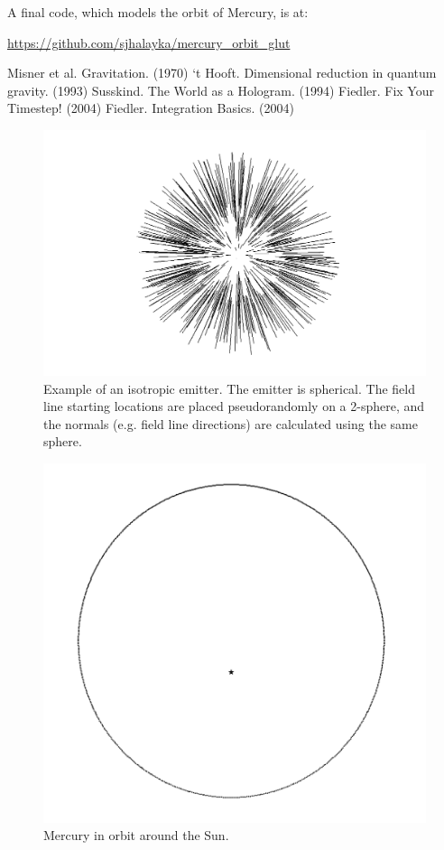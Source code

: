 \documentclass[12pt]{article}
\begin{document}
A final code, which models the orbit of Mercury, is at:

\url{https://github.com/sjhalayka/mercury_orbit_glut}





\begin{thebibliography}{9}

 Misner et al. Gravitation. (1970)
 `t Hooft. Dimensional reduction in quantum gravity. (1993)
 Susskind. The World as a Hologram. (1994)
 Fiedler. Fix Your Timestep! (2004)
 Fiedler. Integration Basics. (2004)

\end{thebibliography}


\pagebreak


\begin{figure} 
\centering
  \includegraphics[width = 4 in]{3.png}
  \caption{
Example of an isotropic emitter.
The emitter is spherical.
The field line starting locations are placed pseudorandomly on a 2-sphere, and the normals (e.g. field line directions) are calculated using the same sphere.
}
\end{figure}


\begin{figure} 
\centering
  \includegraphics[width = 4 in]{mercury.png}
  \caption{
Mercury in orbit around the Sun.
}
\end{figure}
\end{document}
